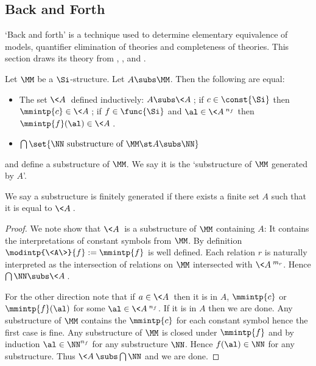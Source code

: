 \subsection{Back and Forth}

`Back and forth' is a technique used to determine 
elementary equivalence of models,
quantifier elimination of theories
and completeness of theories.
This section draws its theory from \cite{poizat}, \cite{openlogicproject},
and \cite{pillay}.

\begin{dfn}
    Let $\MM$ be a $\Si$-structure.
    Let $A \subs \MM$.
    Then the following are equal:
    \begin{itemize}
        \item The set $\<A\>$ defined inductively: $A\subs \<A\>$;
        if $c \in \const{\Si}$ then 
        $\mmintp{c} \in \<A\>$; if $f \in \func{\Si}$ and 
        $\al \in \<A\>^{n_f}$ then $\mmintp{f}(\al) \in \<A\>$.
        \item $\bigcap \set{\NN \text{ substructure of } \MM \st A \subs \NN}$
    \end{itemize}
    and define a substructure of $\MM$.
    We say it is the `substructure of $\MM$ generated by $A$'.
    
    We say a substructure is finitely generated if there exists a finite set 
    $A$ such that it is equal to $\<A\>$.
\end{dfn}
\begin{proof}
    We note show that $\<A\>$ is a substructure of $\MM$ containing $A$:
    It contains the interpretations of constant symbols from $\MM$.
    By definition $\modintp{\<A\>}{f} := \mmintp{f}$ is well defined.
    Each relation $r$ is naturally interpreted as the intersection of relations
    on $\MM$ intersected with $\<A\>^{m_r}$.
    Hence $\bigcap \NN \subs \<A\>$.

    For the other direction note that if $a \in \<A\>$ then it is in $A$,
    $\mmintp{c}$
    or $\mmintp{f}(\al)$ for some $\al \in \<A\>^{n_f}$.
    If it is in $A$ then we are done.
    Any substructure of $\MM$ contains the $\mmintp{c}$ for each constant symbol
    hence the first case is fine.
    Any substructure of $\MM$ is closed under $\mmintp{f}$ and by induction
    $\al \in \NN^{n_f}$ for any substructure $\NN$.
    Hence $f(\al) \in \NN$ for any substructure.
    Thus $\<A\> \subs \bigcap \NN$ and we are done.
\end{proof}

